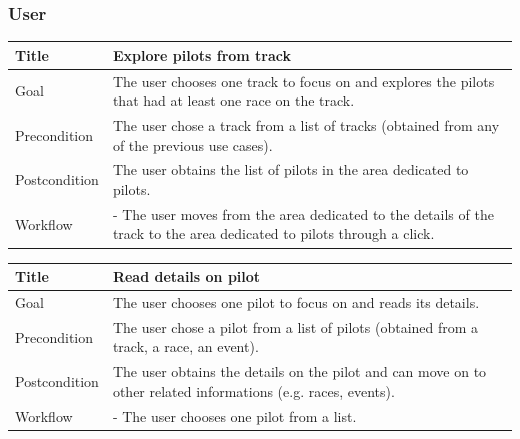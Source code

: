 \documentclass{beamer}
\begin{document}
\begin{frame}
    \frametitle{User}
    \begin{table}
        \tiny
        \begin{tabular}{|p{2cm}|p{6cm}|}
        \hline
        Title & \textbf{Explore pilots from track} \\
        \hline
        Goal & The user chooses one track to focus on and explores the pilots that had at least one race on the track. \\
        \hline
        Precondition & The user chose a track from a list of tracks (obtained from any of the previous use cases).\\
        \hline
        Postcondition & The user obtains the list of pilots in the area dedicated to pilots. \\
        \hline
        Workflow &
        - The user moves from the area dedicated to the details of the track to the
        area dedicated to pilots through a click. \\
        \hline
        \end{tabular}
\end{table}

\begin{table}
    \tiny
    \begin{tabular}{|p{2cm}|p{6cm}|}
    \hline
    Title & \textbf{Read details on pilot} \\
    \hline
    Goal & The user chooses one pilot to focus on and reads its details. \\
    \hline
    Precondition & The user chose a pilot from a list of pilots (obtained from a track, a race, an event).\\
    \hline
    Postcondition & The user obtains the details on the pilot and can move on to other related informations (e.g. races, events). \\
    \hline
    Workflow &
    - The user chooses one pilot from a list. \\
    \hline
    \end{tabular}
\end{table}
\end{frame}


\end{document}
